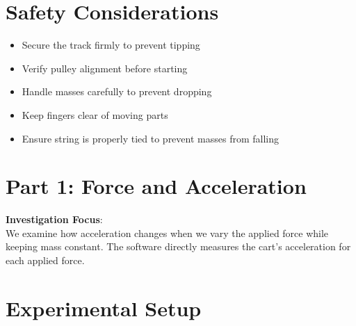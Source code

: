 \documentclass[12pt]{article}
\begin{document}
\section*{Safety Considerations}
\begin{tcolorbox}[colback=safetyyellow!30,colframe=safetyyellow!80,title=\textbf{Safety Protocol}]
\begin{itemize}
\item Secure the track firmly to prevent tipping
\item Verify pulley alignment before starting
\item Handle masses carefully to prevent dropping
\item Keep fingers clear of moving parts
\item Ensure string is properly tied to prevent masses from falling
\end{itemize}
\end{tcolorbox}

\section*{Part 1: Force and Acceleration}

 \textbf{Investigation Focus}:\\
 We examine how acceleration changes when we vary the applied force while keeping mass constant. The software directly measures the cart's acceleration for each applied force.

\section*{Experimental Setup}
\begin{center}
\end{center}
\end{document}

